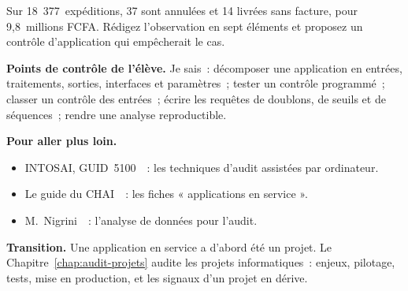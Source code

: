\begin{boxexo}[title={\ding{45}\quad Exercice~18.10. Les factures sans expédition \niveauexpert}]
Sur 18~377~expéditions, 37 sont annulées et 14 livrées sans facture, pour
9,8~millions FCFA. Rédigez l'observation en sept éléments et proposez un
contrôle d'application qui empêcherait le cas.
\end{boxexo}

\bigskip

\begin{boxinfo}
\textbf{Points de contrôle de l'élève.} Je sais~: décomposer une
application en entrées, traitements, sorties, interfaces et paramètres~;
tester un contrôle programmé~; classer un contrôle des entrées~; écrire les
requêtes de doublons, de seuils et de séquences~; rendre une analyse
reproductible.
\end{boxinfo}

\begin{boxinfo}
\textbf{Pour aller plus loin.}
\begin{itemize}
    \item INTOSAI, GUID~5100~\cite{intosai2019guid5100}~: les techniques
          d'audit assistées par ordinateur.
    \item Le guide du CHAI~\cite{chai2014guide}~: les fiches « applications
          en service ».
    \item M.~Nigrini~\cite{nigrini2012benford}~: l'analyse de données
          pour l'audit.
\end{itemize}
\end{boxinfo}

\begin{boxinfo}
\textbf{Transition.} Une application en service a d'abord été un projet.
Le Chapitre~\ref{chap:audit-projets} audite les projets informatiques~:
enjeux, pilotage, tests, mise en production, et les signaux d'un projet en
dérive.
\end{boxinfo}
